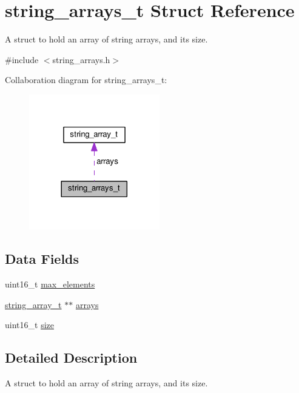 \hypertarget{structstring__arrays__t}{}\section{string\+\_\+arrays\+\_\+t Struct Reference}
\label{structstring__arrays__t}


A struct to hold an array of string arrays, and its size.  




{\ttfamily \#include $<$string\+\_\+arrays.\+h$>$}



Collaboration diagram for string\+\_\+arrays\+\_\+t\+:
\nopagebreak
\begin{figure}[H]
\begin{center}
\leavevmode
\includegraphics[width=161pt]{structstring__arrays__t__coll__graph}
\end{center}
\end{figure}
\subsection*{Data Fields}
\begin{DoxyCompactItemize}
\item 
uint16\+\_\+t \hyperlink{structstring__arrays__t_a44302bf32cb7eede15f027da880e884e}{max\+\_\+elements}
\item 
\hyperlink{structstring__array__t}{string\+\_\+array\+\_\+t} $\ast$$\ast$ \hyperlink{structstring__arrays__t_a6ff6c8bd382d230f4538415fbf78765e}{arrays}
\item 
uint16\+\_\+t \hyperlink{structstring__arrays__t_a0df76b18c735586cd916029fd8d63d9b}{size}
\end{DoxyCompactItemize}


\subsection{Detailed Description}
A struct to hold an array of string arrays, and its size. 

